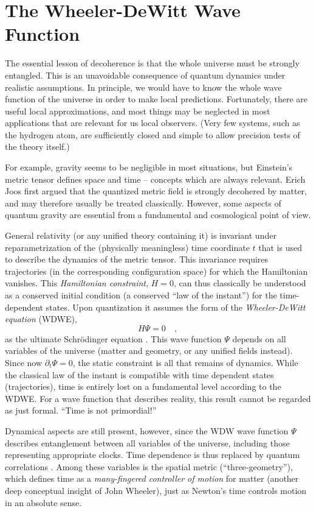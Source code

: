 \section{The Wheeler-DeWitt Wave Function}
The essential lesson of decoherence is that the whole universe
must be strongly entangled. This is an unavoidable
consequence of quantum dynamics under realistic assumptions. In
principle, we would have to know the whole wave function of the
universe in order to make local predictions. Fortunately, there are
useful local approximations, and most things may be neglected in most
applications that are relevant for us local observers. (Very few
systems, such as the hydrogen atom, are sufficiently closed and simple
to allow precision tests of the theory itself.)

For example,  gravity seems to be negligible in most situations, but
Einstein's metric tensor defines space and time -- concepts which are
always relevant. Erich Joos \cite{Joos} first argued that the quantized
metric field is strongly decohered by matter, and may therefore usually
be treated classically. However, some aspects of quantum gravity are
essential from a fundamental and cosmological point of view.

General relativity (or any unified theory containing it) is
invariant under reparametrization of the (physically meaningless) time
coordinate
$t$ that is used to describe the dynamics of the metric tensor. This
invariance requires trajectories (in the corresponding configuration
space) for which the Hamiltonian vanishes. This {\it Hamiltonian
constraint},
$H=0$, can thus classically be understood as a conserved initial
condition (a conserved ``law of the instant'') for the time-dependent
states. Upon quantization it assumes the form of the {\it
Wheeler-DeWitt equation} (WDWE),
$$
H\Psi = 0 \quad ,
$$
as the ultimate
Schr\"odinger equation \cite{DWW}. This wave function $\Psi$ depends on
all variables of the universe (matter and geometry, or any unified
fields instead). Since now $\partial_t \Psi = 0 $, the static
constraint is all that remains of dynamics. While the classical law of
the instant is compatible with time dependent states (trajectories),
time is entirely lost on a fundamental level according to the WDWE.
For a wave function that describes reality, this result cannot be
regarded as just formal. ``Time is not primordial!''
\cite{frontiers}

Dynamical aspects are still present, however, since the WDW wave
function
$\Psi$ describes entanglement between all variables of the universe,
including those representing appropriate clocks. Time dependence is
thus replaced by quantum correlations \cite{PW}. Among these variables
is the spatial metric (``three-geometry''), which defines time as a
{\it many-fingered controller of motion} for matter
\cite{BSW} (another deep conceptual insight of John Wheeler), just as
Newton's time controls motion  in an absolute sense.

